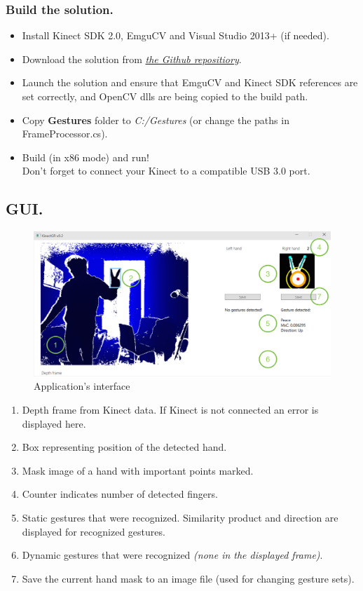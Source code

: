 \documentclass[a4paper,11pt,oneside]{article}
\begin{document}
\subsubsection{Build the solution.}

\begin{itemize}
\item Install Kinect SDK 2.0, EmguCV and Visual Studio 2013+ (if needed).
\item Download the solution from \href{https://github.com/dmitryfd/KinectGR}{\textit{the Github repositiory}}.
\item Launch the solution and ensure that EmguCV and Kinect SDK references are set correctly, and OpenCV dlls are being copied to the build path. 
\item Copy \textbf{Gestures} folder to \textit{C:/Gestures} (or change the paths in FrameProcessor.cs).
\item Build (in x86 mode) and run! \\Don't forget to connect your Kinect to a compatible USB 3.0 port.
\end{itemize}

\subsection{GUI.}

\begin{figure}[H]
\centering
\includegraphics[scale=0.6]{app-gui.png}
\caption{Application's interface}
\end{figure}

\begin{enumerate}
\item Depth frame from Kinect data. If Kinect is not connected an error is displayed here.
\item Box representing position of the detected hand.
\item Mask image of a hand with important points marked.
\item Counter indicates number of detected fingers.
\item Static gestures that were recognized. Similarity product and direction are displayed for recognized gestures.
\item Dynamic gestures that were recognized \textit{(none in the displayed frame)}.
\item Save the current hand mask to an image file (used for changing gesture sets).
\end{enumerate}
\end{document}
